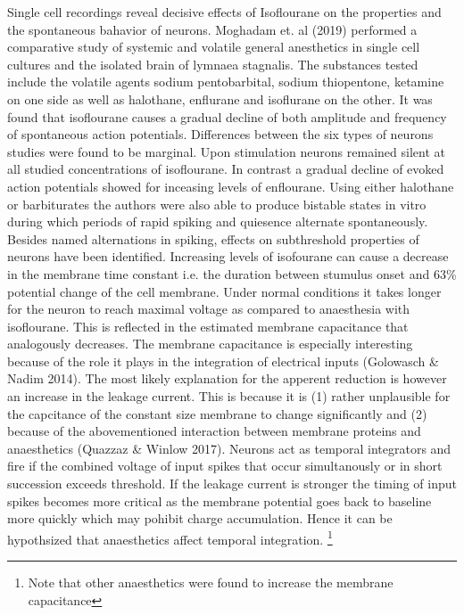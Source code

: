 Single cell recordings reveal decisive effects of Isoflourane on the properties and the spontaneous bahavior of neurons. Moghadam et. al (2019) performed a comparative study of systemic and volatile general anesthetics in single cell cultures and the isolated brain of lymnaea stagnalis. The substances tested include the volatile agents sodium pentobarbital, sodium thiopentone, ketamine on one side as well as halothane, enflurane and isoflurane on the other. It was found that isoflourane causes a gradual decline of both amplitude and frequency of spontaneous action potentials. Differences between the six types of neurons studies were found to be marginal. Upon stimulation neurons remained silent at all studied concentrations of isoflourane. In contrast a gradual decline of evoked action potentials showed for inceasing levels of enflourane. Using either halothane or barbiturates the authors were also able to produce bistable states in vitro during which periods of rapid spiking and quiesence alternate spontaneously.\\
Besides named alternations in spiking, effects on subthreshold properties of neurons have been identified. Increasing levels of isofourane can cause a decrease in the membrane time constant i.e. the duration between stumulus onset and 63\% potential change of the cell membrane. Under normal conditions it takes longer for the neuron to reach maximal voltage as compared to anaesthesia with isoflourane. This is reflected in the estimated membrane capacitance that analogously decreases. The membrane capacitance is especially interesting because of the role it plays in the integration of electrical inputs (Golowasch \& Nadim 2014). The most likely explanation for the apperent reduction is however an increase in the leakage current. This is because it is (1) rather unplausible for the capcitance of the constant size membrane to change significantly and (2) because of the abovementioned interaction between membrane proteins and anaesthetics (Quazzaz \& Winlow 2017). Neurons act as temporal integrators and fire if the combined voltage of input spikes that occur simultanously or in short succession exceeds threshold. If the leakage current is stronger the timing of input spikes becomes more critical as the membrane potential goes back to baseline more quickly which may pohibit charge accumulation. Hence it can be hypothsized that anaesthetics affect temporal integration.  \footnote{ Note that other anaesthetics were found to increase the membrane capacitance}\\
